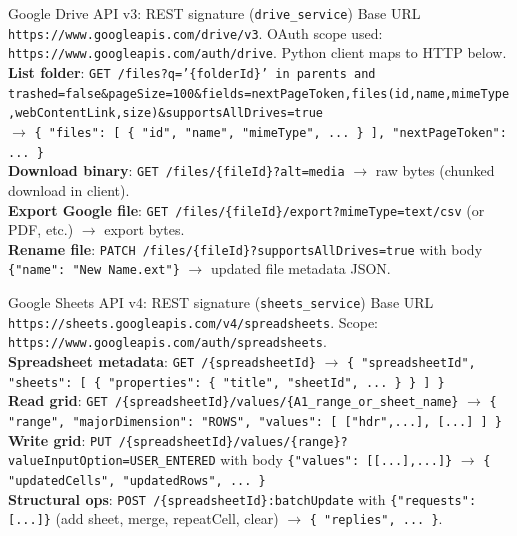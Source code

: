 \documentclass[aspectratio=169]{beamer}
\begin{document}
\begin{frame}[fragile]{Google Drive API v3: REST signature (\texttt{drive\_service})}
  \tiny
  Base URL \texttt{https://www.googleapis.com/drive/v3}. OAuth scope used: \texttt{https://www.googleapis.com/auth/drive}. Python client maps to HTTP below.\\[0.25em]
  \textbf{List folder}: \texttt{GET /files?q='\{folderId\}' in parents and trashed=false\&pageSize=100\&fields=nextPageToken,files(id,name,mimeType,webContentLink,size)\&supportsAllDrives=true}\\
  $\rightarrow$ \texttt{\{ "files": [ \{ "id", "name", "mimeType", ... \} ], "nextPageToken": ... \}}\\[0.25em]
  \textbf{Download binary}: \texttt{GET /files/\{fileId\}?alt=media} $\rightarrow$ raw bytes (chunked download in client).\\[0.25em]
  \textbf{Export Google file}: \texttt{GET /files/\{fileId\}/export?mimeType=text/csv} (or PDF, etc.) $\rightarrow$ export bytes.\\[0.25em]
  \textbf{Rename file}: \texttt{PATCH /files/\{fileId\}?supportsAllDrives=true} with body \texttt{\{"name": "New Name.ext"\}} $\rightarrow$ updated file metadata JSON.
\end{frame}

\begin{frame}[fragile]{Google Sheets API v4: REST signature (\texttt{sheets\_service})}
  \tiny
  Base URL \texttt{https://sheets.googleapis.com/v4/spreadsheets}. Scope: \texttt{https://www.googleapis.com/auth/spreadsheets}.\\[0.25em]
  \textbf{Spreadsheet metadata}: \texttt{GET /\{spreadsheetId\}} $\rightarrow$ \texttt{\{ "spreadsheetId", "sheets": [ \{ "properties": \{ "title", "sheetId", ... \} \} ] \}}\\[0.25em]
  \textbf{Read grid}: \texttt{GET /\{spreadsheetId\}/values/\{A1\_range\_or\_sheet\_name\}} $\rightarrow$ \texttt{\{ "range", "majorDimension": "ROWS", "values": [ ["hdr",...], [...] ] \}}\\[0.25em]
  \textbf{Write grid}: \texttt{PUT /\{spreadsheetId\}/values/\{range\}?valueInputOption=USER\_ENTERED} with body \texttt{\{"values": [[...],...]\}} $\rightarrow$ \texttt{\{ "updatedCells", "updatedRows", ... \}}\\[0.25em]
  \textbf{Structural ops}: \texttt{POST /\{spreadsheetId\}:batchUpdate} with \texttt{\{"requests":[...]\}} (add sheet, merge, repeatCell, clear) $\rightarrow$ \texttt{\{ "replies", ... \}}.
\end{frame}
\end{document}

